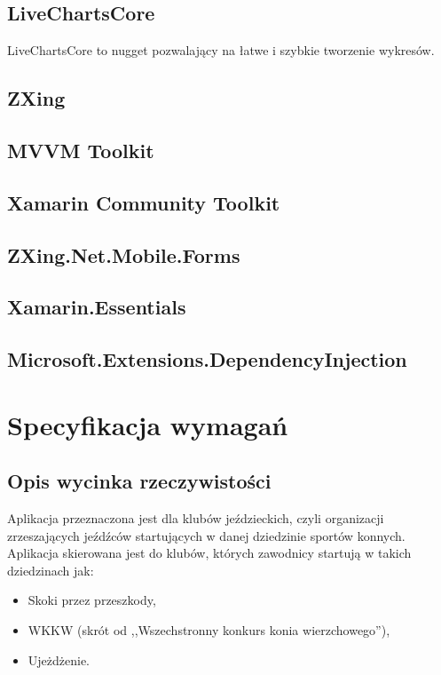 \documentclass[12pt,oneside]{report}
\begin{document}
{\color{red}
\section{LiveChartsCore}
LiveChartsCore to nugget pozwalający na łatwe i szybkie tworzenie wykresów.
\section{ZXing}
\section{MVVM Toolkit}

\section{Xamarin Community Toolkit}

\section{ZXing.Net.Mobile.Forms}

\section{Xamarin.Essentials}
\section{Microsoft.Extensions.DependencyInjection}}


\chapter{Specyfikacja wymagań}
\section{Opis wycinka rzeczywistości}
Aplikacja przeznaczona jest dla klubów jeździeckich, czyli organizacji zrzeszających jeźdźców startujących w danej dziedzinie sportów konnych. Aplikacja skierowana jest do klubów, których zawodnicy startują w takich dziedzinach jak:
\begin{itemize}
	\item Skoki przez przeszkody,
	\item WKKW (skrót od ,,Wszechstronny konkurs konia wierzchowego''),
	\item Ujeżdżenie.
\end{itemize}
\end{document}
